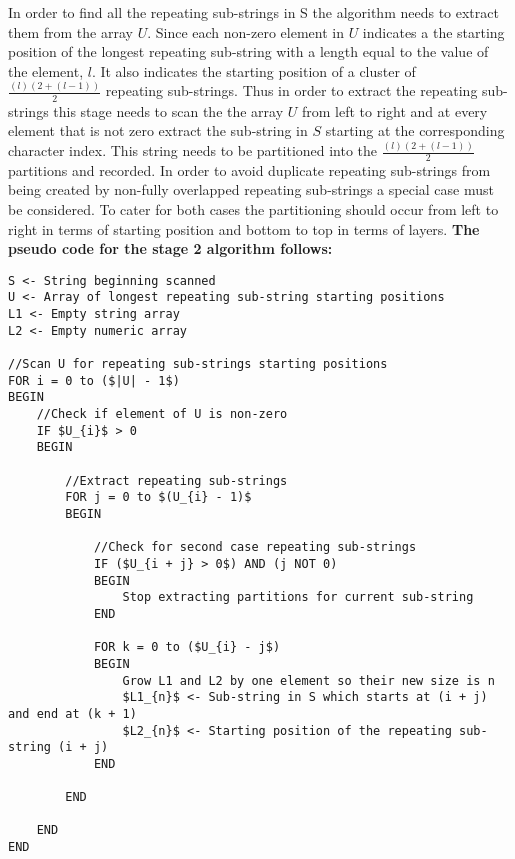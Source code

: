 \documentclass[12pt]{article}
\begin{document}
\begin{flushleft}
	In order to find all the repeating sub-strings in S the algorithm needs to extract them from the array $U$. Since each non-zero element in $U$ indicates a the starting position of the longest repeating sub-string with a length equal to the value of the element, $l$. It also indicates the starting position of a cluster of $\frac{(l)(2 + (l-1))}{2}$ repeating sub-strings. Thus in order to extract the repeating sub-strings this stage needs to scan the the array $U$ from left to right and at every element that is not zero extract the sub-string in $S$ starting at the corresponding character index. This string needs to be partitioned into the $\frac{(l)(2 + (l-1))}{2}$ partitions and recorded. In order to avoid duplicate repeating sub-strings from being created by non-fully overlapped repeating sub-strings a special case must be considered. To cater for both cases the partitioning should occur from left to right in terms of starting position and bottom to top in terms of layers.
	\newpage
	\textbf{The pseudo code for the stage 2 algorithm follows:}

\begin{lstlisting}
S <- String beginning scanned
U <- Array of longest repeating sub-string starting positions
L1 <- Empty string array
L2 <- Empty numeric array

//Scan U for repeating sub-strings starting positions 
FOR i = 0 to ($|U| - 1$)  
BEGIN			                
	//Check if element of U is non-zero
	IF $U_{i}$ > 0 
	BEGIN			             
		
		//Extract repeating sub-strings
		FOR j = 0 to $(U_{i} - 1)$ 
		BEGIN
		                       
			//Check for second case repeating sub-strings
			IF ($U_{i + j} > 0$) AND (j NOT 0) 
			BEGIN
				Stop extracting partitions for current sub-string
			END
			
			FOR k = 0 to ($U_{i} - j$)
			BEGIN                               
				Grow L1 and L2 by one element so their new size is n
				$L1_{n}$ <- Sub-string in S which starts at (i + j) and end at (k + 1)
				$L2_{n}$ <- Starting position of the repeating sub-string (i + j)
			END
		
		END
		
	END	
END		
\end{lstlisting}
		
		
\end{flushleft}
\end{document}
